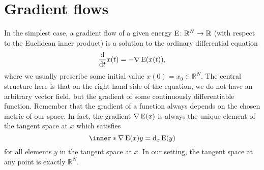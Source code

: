 \section{Gradient flows}
	\label{section_gradient_flows}
In the simplest case, a gradient flow of a given energy $ \operatorname{E} \colon 
\mathbb{ R }^{ N } \to \mathbb{ R } $ (with respect to the Euclidean inner 
product) is a solution to the ordinary differential equation
\begin{equation}
	\label{gf_basic_equation}
	\dv{ t } x ( t ) = - \nabla \operatorname{E} ( x ( t ) ) ,
\end{equation}
where we usually prescribe some initial value $ x ( 0 ) = x_{ 0 } \in \mathbb{ 
R }^{ N } $. The central structure here is that on the right hand side of the 
equation, we do not have an arbitrary vector field, but the gradient of some 
continuously 
differentiable function. Remember that the gradient of a function always 
depends on the chosen metric of our space. In fact, the gradient $ \nabla 
\operatorname{E} ( x ) $ is always the unique element of the tangent space at $ x $ 
which 
satisfies
\begin{equation*}
	\inner*{ \nabla \energy ( x ) }{ y }
	=
	\dd_{ x } \energy ( y ) 
\end{equation*}
for all elements $ y $ in the tangent space at $ x $. In our setting, the 
tangent space at any point is exactly $ \mathbb{ R }^{ N } $.  

